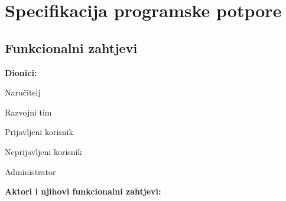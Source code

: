 \chapter{Specifikacija programske potpore}
		
	\section{Funkcionalni zahtjevi}
						
			\noindent \textbf{Dionici:}
			
			\begin{packed_enum}
				
				\item Naručitelj
				\item Razvojni tim
				\item Prijavljeni korisnik
				\item Neprijavljeni korisnik
				\item Administrator			
				
			\end{packed_enum}
			
			\noindent \textbf{Aktori i njihovi funkcionalni zahtjevi:}
			
